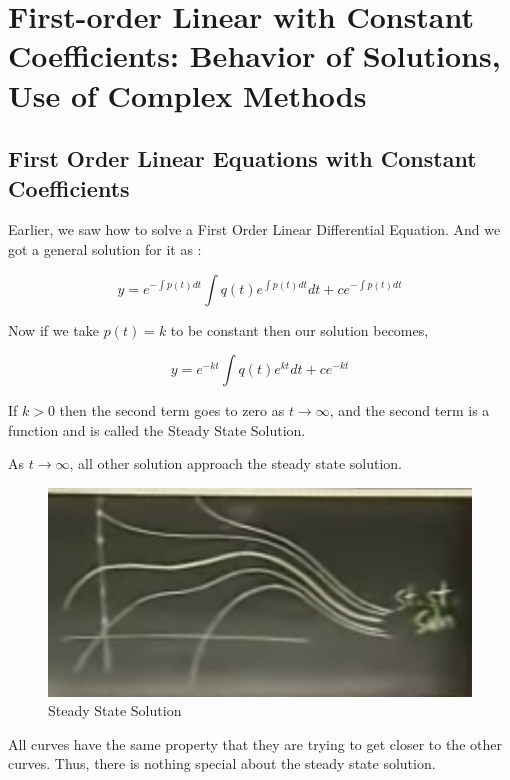 

\chapter{First-order Linear with Constant Coefficients: Behavior of Solutions, Use of Complex Methods} 

\bigbreak

\section{First Order Linear Equations with Constant Coefficients}

Earlier, we saw how to solve a First Order Linear Differential Equation. 
And we got a general solution for it as :

$$ y = e^{-\int p(t)dt } \int q(t) e^{\int p(t) dt} dt + ce^{- \int p(t) dt} $$

Now if we take $p(t) = k$ to be constant then our solution becomes,

$$ y = e^{-kt} \int q(t) e^{kt} dt + ce^{-kt} $$

If $k > 0$ then the second term goes to zero as $t \to \infty$, and the second term is a function and is called the Steady State Solution.

As $t \to \infty$, all other solution approach the steady state solution.

\begin{figure}[ht!]
	\centering
	\includegraphics[scale=0.5]{./images/lecture_7_figure_1.png}
	\caption{Steady State Solution}
\end{figure}

All curves have the same property that they are trying to get closer to the other curves.
Thus, there is nothing special about the steady state solution.

